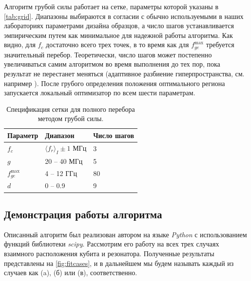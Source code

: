 \documentclass[14pt, a4paper]{extreport}
\numberwithin{equation}{section}
\begin{document}
Алгоритм грубой силы работает на сетке, параметры которой указаны в \autoref{tab:grid}. Диапазоны выбираются в согласии с обычно используемыми в наших лабораториях параметрами дизайна образцов, а число шагов устанавливается эмпирическим путем как минимальное для надежной работы алгоритма. Как видно, для $f_c$ достаточно всего трех точек, в то время как для $f_{ge}^\text{max}$ требуется значительный перебор. Теоретически, число шагов может постепенно увеличиваться самим алгоритмом во время выполнения до тех пор, пока результат не перестанет меняться (адаптивное разбиение гиперпространства, см. например \cite{Nijholt2019}). После грубого определения положения оптимального региона запускается локальный оптимизатор по всем шести параметрам.

\begin{table}
	\centering
		\small{\begin{tabular}{lll} \toprule
			Параметр & Диапазон & Число шагов \\ 
			\midrule
			$f_c$ & $\langle f_r \rangle_{I} \pm 1$ МГц & 3\\ 
			$g$ & 20 -- 40 МГц & 5\\
			$f_{ge}^\text{max}$ &  4 -- 12 ГГц & 80 \\
			$d$& 0 -- 0.9 & 9\\
			\bottomrule
		\end{tabular} }
	\caption{Спецификация сетки для полного перебора методом грубой силы.}
	\label{tab:grid}
\end{table}

\subsection{Демонстрация работы алгоритма}

Описанный алгоритм был реализован автором на языке \foreignlanguage{english}{\textit{Python}} с использованием функций библиотеки \foreignlanguage{english}{\textit{scipy}}. Рассмотрим его работу на всех трех случаях взаимного расположения кубита и резонатора. Полученные результаты представлены на \autoref{fig:fitcases}, и в дальнейшем мы будем называть каждый из случаев как (a), (б) или (в), соответственно.
\end{document}

